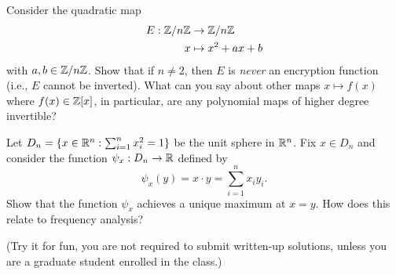 \documentclass[11pt]{amsart}
\newcounter{problem}
\begin{document}
\begin{problem}
Consider the quadratic map
\begin{align*}
E:\mathbb{Z}/n\mathbb{Z} &\to \mathbb{Z}/n\mathbb{Z} \\
x &\mapsto x^2+ax+b
\end{align*}
with $a,b \in \mathbb{Z}/n\mathbb{Z}$.  Show that if $n \neq 2$, then $E$ is
\emph{never} an encryption function (i.e., $E$ cannot be inverted).
What can you say about other maps $x \mapsto f(x)$ where $f(x) \in
\mathbb{Z}[x]$, in particular, are any polynomial maps of higher degree invertible?
\end{problem}

\begin{problem}
Let $D_n = \{x \in \mathbb{R}^n : \sum_{i=1}^n x_i^2 = 1\}$ be the unit sphere
in $\mathbb{R}^n$.  Fix $x \in D_n$ and consider the function $\psi_x : D_n
\to \mathbb{R}$ defined by
\[
\psi_x(y) = x \cdot y = \sum_{i=1}^n x_i y_i.
\]
Show that the function $\psi_x$ achieves a unique maximum at $x=y$.
How does this relate to frequency analysis?
\end{problem}

\medskip

 (Try it for fun, you are not
required to submit written-up solutions, unless you are a graduate
student enrolled in the class.)
\end{document}
